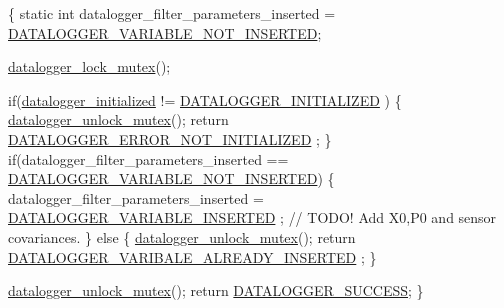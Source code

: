 \begin{DoxyCode}
\{
    \textcolor{keyword}{static} \textcolor{keywordtype}{int} datalogger\_filter\_parameters\_inserted = 
      \hyperlink{datalogger_01_07Caio-PC's_01conflicted_01copy_012012-11-23_08_8h_a1f4fd2dbd981cf35467ab688c9157a74}{DATALOGGER\_VARIABLE\_NOT\_INSERTED};

    \hyperlink{datalogger_01_07Caio-PC's_01conflicted_01copy_012012-11-23_08_8c_a54b06d9395b2e370a5a72beb7f9524b2}{datalogger\_lock\_mutex}();

    \textcolor{keywordflow}{if}(\hyperlink{datalogger_01_07Caio-PC's_01conflicted_01copy_012012-11-23_08_8c_a35e8fbe04b90452afdc3c1be16ff6187}{datalogger\_initialized} != \hyperlink{datalogger_01_07Caio-PC's_01conflicted_01copy_012012-11-23_08_8h_a684c343d340004b77ca2b782934c96ca}{DATALOGGER\_INITIALIZED}
      )
    \{
        \hyperlink{datalogger_01_07Caio-PC's_01conflicted_01copy_012012-11-23_08_8c_a85453211c0c809083c36cc56b275aeeb}{datalogger\_unlock\_mutex}();
        \textcolor{keywordflow}{return} \hyperlink{datalogger_01_07Caio-PC's_01conflicted_01copy_012012-11-23_08_8h_a60df7fe0e61b757ad6a9db106b0eb43e}{DATALOGGER\_ERROR\_NOT\_INITIALIZED}
      ;
    \}
    \textcolor{keywordflow}{if}(datalogger\_filter\_parameters\_inserted == \hyperlink{datalogger_01_07Caio-PC's_01conflicted_01copy_012012-11-23_08_8h_a1f4fd2dbd981cf35467ab688c9157a74}{
      DATALOGGER\_VARIABLE\_NOT\_INSERTED})
    \{
        datalogger\_filter\_parameters\_inserted = \hyperlink{datalogger_01_07Caio-PC's_01conflicted_01copy_012012-11-23_08_8h_a181f9a0649abd26c74ed1a8a1710e25f}{DATALOGGER\_VARIABLE\_INSERTED}
      ;
        \textcolor{comment}{// TODO! Add X0,P0 and sensor covariances.}
    \}
    \textcolor{keywordflow}{else}
        \{
        \hyperlink{datalogger_01_07Caio-PC's_01conflicted_01copy_012012-11-23_08_8c_a85453211c0c809083c36cc56b275aeeb}{datalogger\_unlock\_mutex}();
        \textcolor{keywordflow}{return} \hyperlink{datalogger_01_07Caio-PC's_01conflicted_01copy_012012-11-23_08_8h_ac76269a113d60c063e857d14e4a2f640}{DATALOGGER\_VARIBALE\_ALREADY\_INSERTED}
      ;
        \}

    \hyperlink{datalogger_01_07Caio-PC's_01conflicted_01copy_012012-11-23_08_8c_a85453211c0c809083c36cc56b275aeeb}{datalogger\_unlock\_mutex}();
    \textcolor{keywordflow}{return} \hyperlink{datalogger_01_07Caio-PC's_01conflicted_01copy_012012-11-23_08_8h_abddebaf71d26d40183fccbb1a766b983}{DATALOGGER\_SUCCESS};
\}
\end{DoxyCode}
